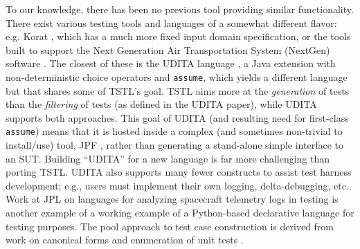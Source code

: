 \documentclass{sig-alternate}
\begin{document}
To our knowledge, there has been no previous tool providing similar
functionality.  
There exist various testing tools and languages of a somewhat
different flavor: e.g. Korat \cite{Korat}, which has a much more fixed
input domain specification, or the tools built to support the Next
Generation Air Transportation System (NextGen) software
\cite{TameInputs}.  The closest of these is the UDITA language
\cite{UDITA}, a Java extension with non-deterministic choice
operators and {\tt assume}, which yields a different language but
that shares some of TSTL's goal.  TSTL aims more at the \emph{generation} of
tests than the \emph{filtering} of tests (as defined in the UDITA
paper), while UDITA supports both approaches.  This goal of UDITA (and
resulting need for first-class {\tt assume}) means that it is hosted
inside a complex (and sometimes non-trivial to install/use) tool, JPF
\cite{JPF2}, rather than generating a stand-alone simple interface to
an SUT.  Building ``UDITA'' for a new language is
far more challenging than porting TSTL.  UDITA also supports many fewer
constructs to assist test harness development; e.g., users must
implement their own logging, delta-debugging, etc..
Work at JPL on languages for analyzing spacecraft telemetry
logs in testing \cite{scriptstospecs} is another example of a working example of a
Python-based declarative language for testing purposes.  The pool
approach to test case construction is derived from work on canonical
forms and enumeration of unit tests \cite{AndrewsTR}.



\end{document}
